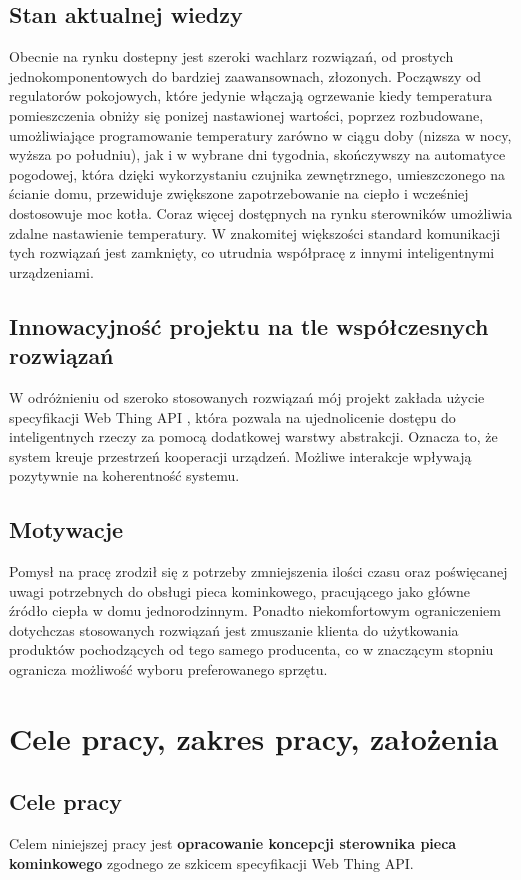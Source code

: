 \documentclass[12pt]{report}
\begin{document}
 \section{Stan aktualnej wiedzy}
 Obecnie na rynku dostepny jest szeroki wachlarz rozwiązań, od prostych jednokomponentowych do bardziej zaawansownach, złozonych. Począwszy od regulatorów pokojowych, które jedynie włączają ogrzewanie kiedy temperatura pomieszczenia obniży się ponizej nastawionej wartości, poprzez rozbudowane, umożliwiające programowanie temperatury zarówno w ciągu doby (nizsza w nocy, wyższa po południu), jak i w wybrane dni tygodnia, skończywszy na automatyce pogodowej, która dzięki wykorzystaniu czujnika zewnętrznego, umieszczonego na ścianie domu, przewiduje zwiększone zapotrzebowanie na ciepło i wcześniej dostosowuje moc kotła.
 Coraz więcej dostępnych na rynku sterowników umożliwia zdalne nastawienie temperatury. W znakomitej większości standard komunikacji tych rozwiązań jest zamknięty, co utrudnia współpracę  z innymi inteligentnymi urządzeniami.
 
 \section{Innowacyjność projektu na tle współczesnych rozwiązań}
 W odróżnieniu od szeroko stosowanych rozwiązań mój projekt zakłada użycie specyfikacji Web Thing API \cite{Mazurek2018}, która pozwala na ujednolicenie dostępu do inteligentnych rzeczy za pomocą dodatkowej warstwy abstrakcji. Oznacza to, że system kreuje przestrzeń kooperacji urządzeń. Możliwe interakcje wpływają pozytywnie na koherentność systemu.
 
 \section{Motywacje}
Pomysł na pracę zrodził się z potrzeby zmniejszenia ilości czasu oraz poświęcanej uwagi potrzebnych do obsługi pieca kominkowego, pracującego jako główne źródło ciepła w domu jednorodzinnym. Ponadto niekomfortowym ograniczeniem dotychczas stosowanych rozwiązań jest zmuszanie klienta do użytkowania produktów pochodzących od tego samego producenta, co w znaczącym stopniu ogranicza możliwość wyboru preferowanego sprzętu.


 \chapter{Cele pracy, zakres pracy, założenia}

 \section{Cele pracy}
 Celem niniejszej pracy jest \textbf{opracowanie koncepcji sterownika pieca kominkowego} zgodnego ze szkicem specyfikacji Web Thing API.
 
\end{document}
